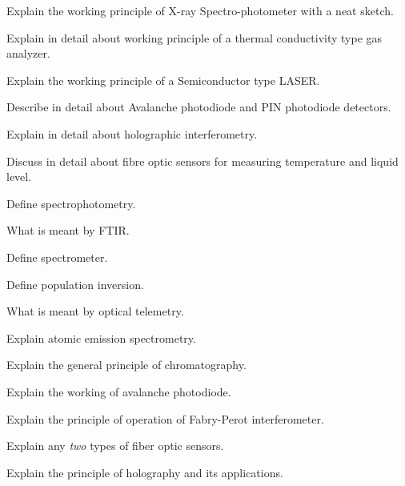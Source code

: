 \newpage \again

\item \iitem Explain the working principle of X-ray Spectro-photometer with a neat
  sketch.
\Or
\item Explain in detail about working principle of a thermal conductivity type
  gas analyzer.
\ene

\item \iitem Explain the working principle of a Semiconductor type LASER.
\Or
\item Describe in detail about Avalanche photodiode and PIN photodiode detectors.
\ene

\item \iitem Explain in detail about holographic interferometry.
\Or
\item Discuss in detail about fibre optic sensors for measuring temperature and
  liquid level.
\ene
\markC
\ene

\newpage



\sub{\subj}

\maxtime


\partA


\iitem Define spectrophotometry.

\item What is meant by FTIR.

\item Define spectrometer.

\item Define population inversion.

\item What is meant by optical telemetry.


\markA
\partB


\item Explain atomic emission spectrometry.

\item Explain the general principle of chromatography.

\item Explain the working of avalanche photodiode.

\item Explain the principle of operation of Fabry-Perot interferometer.

\item Explain any \emph{two} types of fiber optic sensors.

\item Explain the principle of holography and its applications.


